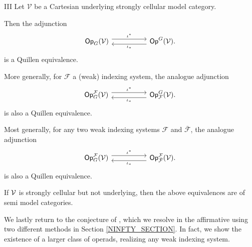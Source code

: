 \documentclass[a4paper,10pt]{article}%
\begin{document}
\begin{customthm}{III}\label{MAINQUILLENEQUIV THM}
Let $\mathcal{V}$ be a Cartesian underlying strongly cellular model category.

Then the adjunction 
\begin{equation}
\begin{tikzcd}[column sep =5em]
	\mathsf{Op}_G(\mathcal{V}) \ar[shift left=1.5]{r}{\iota^{\**}} 
	&
	\mathsf{Op}^G(\mathcal{V})
	\ar[shift left=1.5]{l}{\iota_{\**}} .
\end{tikzcd}
\end{equation}
is a Quillen equivalence.

More generally, for $\mathcal{F}$ a (weak) indexing system, 
the analogue adjunction
\begin{equation}
\begin{tikzcd}[column sep =5em]
	\mathsf{Op}_{G}^{\mathcal F}(\mathcal{V}) \ar[shift left=1.5]{r}{\iota^{\**}} 
	&
	\mathsf{Op}^G_{\mathcal{F}}(\mathcal{V})
	\ar[shift left=1.5]{l}{\iota_{\**}} .
\end{tikzcd}
\end{equation}
is also a Quillen equivalence.

Most generally, for any two weak indexing systems $\mathcal F$ and $\bar{\mathcal F}$, the analogue adjunction
\begin{equation}
\begin{tikzcd}[column sep =5em]
	\mathsf{Op}_{G}^{\mathcal F}(\mathcal{V}) \ar[shift left=1.5]{r}{\iota^{\**}} 
	&
	\mathsf{Op}^{\mathcal F}_{\bar{\mathcal{F}}}(\mathcal{V})
	\ar[shift left=1.5]{l}{\iota_{\**}} .
\end{tikzcd}
\end{equation}
is also a Quillen equivalence.
\end{customthm}

If $\mathcal V$ is strongly cellular but not underlying, then the above equivalences are of semi model categories.

We lastly return to the conjecture of \cite{BH15}, which we resolve in the affirmative using two different methods in Section \ref{NINFTY_SECTION}. In fact, we show the existence of a larger class of operads, realizing any weak indexing system.
\end{document}
